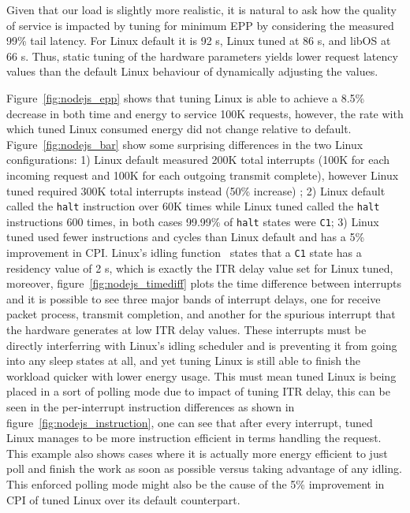 Given that our load is slightly more realistic, it is natural to ask how the quality of service is impacted by tuning for minimum EPP by considering the measured 99\% tail latency.   For Linux default it is 92 \micro s, Linux tuned at 86 \micro s, and libOS at 66 \micro s.  Thus, static tuning of the hardware parameters yields lower request latency values than the default Linux behaviour of dynamically adjusting the values.



Figure~\ref{fig:nodejs_epp} shows that tuning Linux is able to achieve a 8.5\% decrease in both time and energy to service 100K requests, however, the rate with which tuned Linux consumed energy did not change relative to default. Figure~\ref{fig:nodejs_bar} show some surprising differences in the two Linux configurations: 1) Linux default measured 200K total interrupts (100K for each incoming request and 100K for each outgoing transmit complete), however Linux tuned required 300K total interrupts instead (50\% increase) ; 2) Linux default called the \texttt{halt} instruction over 60K times while Linux tuned called the \texttt{halt} instructions 600 times, in both cases 99.99\% of \texttt{halt} states were \texttt{C1}; 3) Linux tuned used fewer instructions and cycles than Linux default and has a 5\% improvement in CPI. Linux's idling function~\cite{linux_idle} states that a \texttt{C1} state has a residency value of 2 \micro s, which is exactly the ITR delay value set for Linux tuned, moreover, figure~\ref{fig:nodejs_timediff} plots the time difference between interrupts and it is possible to see three major bands of interrupt delays, one for receive packet process, transmit completion, and another for the spurious interrupt that the hardware generates at low ITR delay values. These interrupts must be directly interferring with Linux's idling scheduler and is preventing it from going into any sleep states at all, and yet tuning Linux is still able to finish the workload quicker with lower energy usage. This must mean tuned Linux is being placed in a sort of polling mode due to impact of tuning ITR delay, this can be seen in the per-interrupt instruction differences as shown in figure~\ref{fig:nodejs_instruction}, one can see that after every interrupt, tuned Linux manages to be more instruction efficient in terms handling the request. This example also shows cases where it is actually more energy efficient to just poll and finish the work as soon as possible versus taking advantage of any idling. This enforced polling mode might also be the cause of the 5\% improvement in CPI of tuned Linux over its default counterpart.


